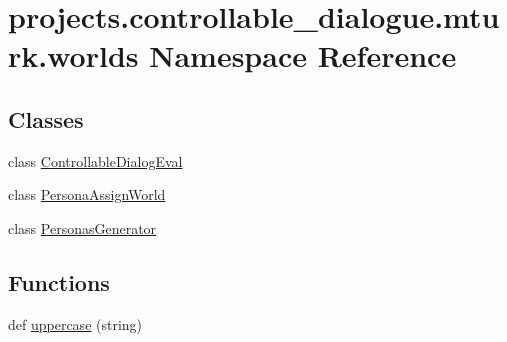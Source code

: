 \hypertarget{namespaceprojects_1_1controllable__dialogue_1_1mturk_1_1worlds}{}\section{projects.\+controllable\+\_\+dialogue.\+mturk.\+worlds Namespace Reference}
\label{namespaceprojects_1_1controllable__dialogue_1_1mturk_1_1worlds}
\subsection*{Classes}
\begin{DoxyCompactItemize}
\item 
class \hyperlink{classprojects_1_1controllable__dialogue_1_1mturk_1_1worlds_1_1ControllableDialogEval}{Controllable\+Dialog\+Eval}
\item 
class \hyperlink{classprojects_1_1controllable__dialogue_1_1mturk_1_1worlds_1_1PersonaAssignWorld}{Persona\+Assign\+World}
\item 
class \hyperlink{classprojects_1_1controllable__dialogue_1_1mturk_1_1worlds_1_1PersonasGenerator}{Personas\+Generator}
\end{DoxyCompactItemize}
\subsection*{Functions}
\begin{DoxyCompactItemize}
\item 
def \hyperlink{namespaceprojects_1_1controllable__dialogue_1_1mturk_1_1worlds_a661f3cc70180bbd2379e66e5844f7900}{uppercase} (string)
\end{DoxyCompactItemize}
